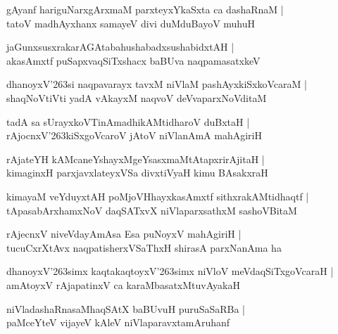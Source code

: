 \documentclass[twoside,12pt,openright]{book}
\def\S{\char'263}
\newcounter{shloka}[chapter]
\begin{document}
\begin{shloka}%
gAyanf hariguNarxgArxmaM parxteyxYkaSxta ca dashaRnaM |\\
tatoV madhAyxhanx samayeV divi duMduBayoV muhuH 
\end{shloka}

\begin{shloka}%
jaGunxsusxrakarAGAtabahushabadxsushabidxtAH |\\
akasAmxtf puSapxvaqSiTxshacx baBUva naqpamasatxkeV 
\end{shloka}

\begin{shloka}%
dhanoyxV\S si naqpavarayx tavxM niVlaM pashAyxkiSxkoVcaraM |\\
shaqNoVtiVti yadA vAkayxM naqvoV deVvaparxNoVditaM 
\end{shloka}

\begin{shloka}%
tadA sa sUrayxkoVTinAmadhikAMtidharoV duBxtaH |\\
rAjocnxV\S kiSxgoVcaroV jAtoV niVlanAmA mahAgiriH 
\end{shloka}

\begin{shloka}%
rAjateYH kAMcaneYshayxMgeYsasxmaMtAtapxrirAjitaH |\\
kimaginxH parxjavxlateyxVSa divxtiVyaH kimu BAsakxraH
\end{shloka}

\begin{shloka}%
kimayaM veYduyxtAH poMjoVHhayxkasAmxtf sithxrakAMtidhaqtf |\\
tApasabArxhamxNoV daqSATxvX niVlaparxsathxM sashoVBitaM
\end{shloka}

\begin{shloka}%
rAjecnxV niveVdayAmAsa Esa puNoyxV mahAgiriH |\\
tucuCxrXtAvx naqpatisherxVSaThxH shirasA parxNanAma ha 
\end{shloka}

\begin{shloka}%
dhanoyxV\S simx kaqtakaqtoyxV\S simx niVloV meVdaqSiTxgoVcaraH |\\
amAtoyxV rAjapatinxV ca karaMbasatxMtuvAyakaH 
\end{shloka}

\begin{shloka}%
niVladashaRnasaMhaqSAtX baBUvuH puruSaSaRBa |\\
paMceYteV vijayeV kAleV niVlaparavxtamAruhanf 
\end{shloka}
\end{document}
